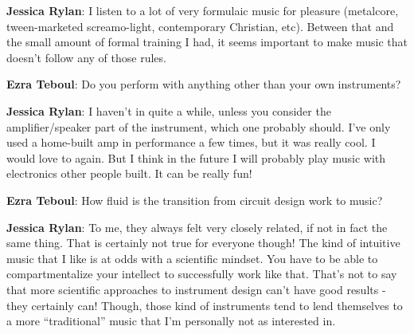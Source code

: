 \textbf{Jessica Rylan}: I listen to a lot of very formulaic music for pleasure (metalcore, tween-marketed screamo-light, contemporary Christian, etc). Between that and the small amount of formal training I had, it seems important to make music that doesn't follow any of those rules.

\textbf{Ezra Teboul}: Do you perform with anything other than your own instruments? 
                  
\textbf{Jessica Rylan}: I haven't in quite a while, unless you consider the amplifier/speaker part of the instrument, which one probably should. I've only used a home-built amp in performance a few times, but it was really cool. I would love to again. But I think in the future I will probably play music with electronics other people built. It can be really fun!

\textbf{Ezra Teboul}: How fluid is the transition from circuit design work to music?  

\textbf{Jessica Rylan}: To me, they always felt very closely related, if not in fact the same thing. That is certainly not true for everyone though! The kind of intuitive music that I like is at odds with a scientific mindset. You have to be able to compartmentalize your intellect to successfully work like that. That's not to say that more scientific approaches to instrument design can't have good results - they certainly can! Though, those kind of instruments tend to lend themselves to a more ``traditional'' music that I'm personally not as interested in.

\newpage
\clearpage 
